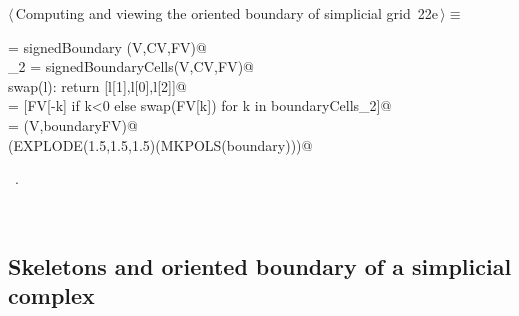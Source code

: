 \documentclass[11pt,oneside]{article}	%
\begin{document}
\begin{flushleft} \small
\begin{minipage}{\linewidth} \label{scrap54}
\protect{}$\langle\,$Computing and viewing the oriented boundary of simplicial grid\nobreak\ {\footnotesize 22e}$\,\rangle\equiv$
\vspace{-1ex}
\begin{list}{}{} \item
\mbox{}\verb@csrSignedBoundaryMat = signedBoundary (V,CV,FV)@\\
\mbox{}\verb@boundaryCells_2 = signedBoundaryCells(V,CV,FV)@\\
\mbox{}\verb@def swap(l): return [l[1],l[0],l[2]]@\\
\mbox{}\verb@boundaryFV = [FV[-k] if k<0 else swap(FV[k]) for k in boundaryCells_2]@\\
\mbox{}\verb@boundary = (V,boundaryFV)@\\
\mbox{}\verb@VIEW(EXPLODE(1.5,1.5,1.5)(MKPOLS(boundary)))@\\
\mbox{}\verb@@{\NWsep}
\end{list}
\vspace{-1ex}
\footnotesize\addtolength{\baselineskip}{-1ex}
\begin{list}{}{\setlength{\itemsep}{-\parsep}\setlength{\itemindent}{-\leftmargin}}
\item \NWtxtMacroRefIn\ .
\end{list}
\end{minipage}\\[4ex]
\end{flushleft}


\subsection{Skeletons and oriented boundary of a simplicial complex}
\end{document}
